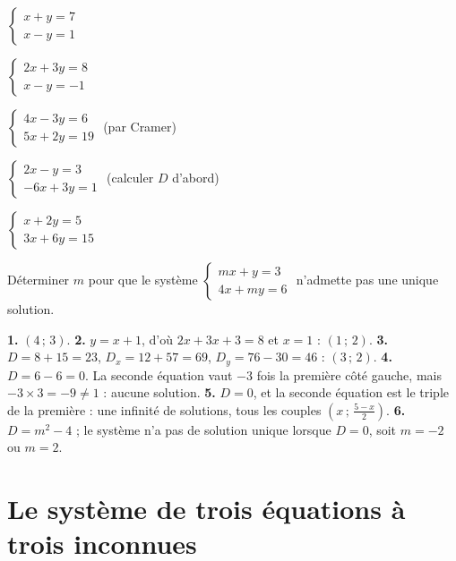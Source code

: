 \begin{entrainement}
\exo[\niveau{1}] $\begin{cases} x+y = 7\\ x-y = 1\end{cases}$

\exo[\niveau{1}] $\begin{cases} 2x+3y = 8\\ x-y = -1\end{cases}$

\exo[\niveau{2}] $\begin{cases} 4x-3y = 6\\ 5x+2y = 19\end{cases}$
\quad (par Cramer)

\exo[\niveau{2}] $\begin{cases} 2x-y = 3\\ -6x+3y = 1\end{cases}$
\quad (calculer $D$ d'abord)

\exo[\niveau{2}] $\begin{cases} x+2y = 5\\ 3x+6y = 15\end{cases}$

\exo[\niveau{3}] Déterminer $m$ pour que le système
$\begin{cases} mx+y = 3\\ 4x+my = 6\end{cases}$
n'admette pas une unique solution.
\end{entrainement}

\begin{corrige}
\textbf{1.} $(4\,;\,3)$.
\textbf{2.} $y = x+1$, d'où $2x+3x+3 = 8$ et $x = 1$ : $(1\,;\,2)$.
\textbf{3.} $D = 8+15 = 23$, $D_{x} = 12+57 = 69$, $D_{y} = 76-30 = 46$ :
$(3\,;\,2)$.
\textbf{4.} $D = 6-6 = 0$. La seconde équation vaut $-3$ fois la première
côté gauche, mais $-3\times3 = -9 \neq 1$ : aucune solution.
\textbf{5.} $D = 0$, et la seconde équation est le triple de la première :
une infinité de solutions, tous les couples $\left(x\,;\,\frac{5-x}{2}\right)$.
\textbf{6.} $D = m^{2}-4$ ; le système n'a pas de solution unique lorsque
$D = 0$, soit $m = -2$ ou $m = 2$.
\end{corrige}

\section{Le système de trois équations à trois inconnues}

